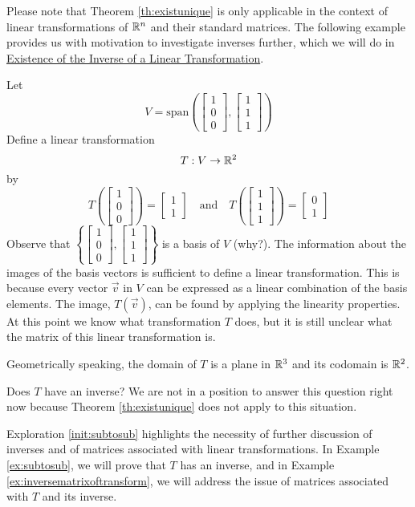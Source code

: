 \documentclass{ximera}
\begin{document}
Please note that Theorem \ref{th:existunique} is only applicable in the context of linear transformations of $\mathbb{R}^n$ and their standard matrices.  The following example provides us with motivation to investigate inverses further, which we will do in \href{https://ximera.osu.edu/linearalgebradzv3/LinearAlgebraInteractiveIntro/LTR-0035/main}{Existence of the Inverse of a Linear Transformation}.

\begin{exploration}\label{init:subtosub}
Let $$V=\text{span}\left(\begin{bmatrix}1\\0\\0\end{bmatrix}, \begin{bmatrix}1\\1\\1\end{bmatrix}\right)$$
Define a linear transformation $$T:V\rightarrow \mathbb{R}^2$$
by $$T\left(\begin{bmatrix}1\\0\\0\end{bmatrix}\right)=\begin{bmatrix}1\\1\end{bmatrix}\quad \text{and} \quad T\left(\begin{bmatrix}1\\1\\1\end{bmatrix}\right)=\begin{bmatrix}0\\1\end{bmatrix}$$
Observe that $\left\{\begin{bmatrix}1\\0\\0\end{bmatrix}, \begin{bmatrix}1\\1\\1\end{bmatrix}\right\}$ is a basis of $V$ (why?). The information about the images of the basis vectors is sufficient to define a linear transformation.  This is because every vector $\vec{v}$ in $V$ can be expressed as a linear combination of the basis elements.  The image, $T(\vec{v})$, can be found by applying the linearity properties.
At this point we know what transformation $T$ does, but it is still unclear what the matrix of this linear transformation is.

Geometrically speaking, the domain of $T$ is a plane in $\mathbb{R}^3$ and its codomain is $\mathbb{R}^2$.  

Does $T$ have an inverse?  We are not in a position to answer this question right now because Theorem \ref{th:existunique} does not apply to this situation. 
\end{exploration}
Exploration \ref{init:subtosub} highlights the necessity of further discussion of inverses and of matrices associated with linear transformations.  In Example \ref{ex:subtosub}, we will prove that $T$ has an inverse, and in Example \ref{ex:inversematrixoftransform}, we will address the issue of matrices associated with $T$ and its inverse.
\end{document}
